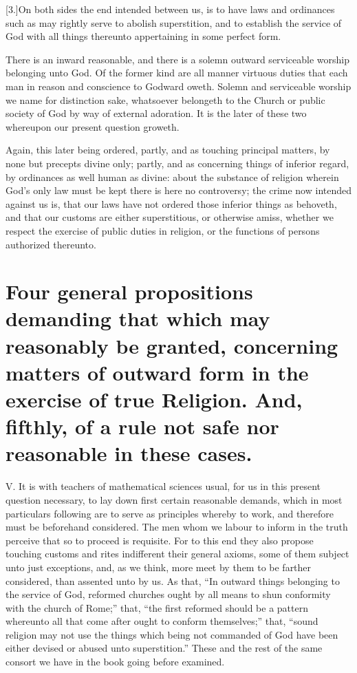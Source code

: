 [3.]On both sides the end intended between us, is to have laws and ordinances such as may rightly serve to abolish superstition, and to establish the service of God with all things thereunto appertaining in some perfect form.

There is an inward reasonable, and there is a solemn outward serviceable worship belonging unto God. Of the former kind are all manner virtuous duties that each man in reason and conscience to Godward oweth. Solemn and serviceable worship we name for distinction sake, whatsoever belongeth to the Church or public society of God by way of external adoration. It is the later of these two whereupon our present question groweth.

Again, this later being ordered, partly, and as touching principal matters, by none but precepts divine only; partly, and as concerning things of inferior regard, by ordinances as well human as divine: about the substance of religion wherein God’s only law must be kept there is here no controversy; the crime now intended against us is, that our laws have not ordered those inferior things as behoveth, and that our customs are either superstitious, or otherwise amiss, whether we respect the exercise of public duties in religion, or the functions of persons authorized thereunto.


\section*{Four general propositions demanding that which may reasonably be granted, concerning matters of outward form in the exercise of true Religion. And, fifthly, of a rule not safe nor reasonable in these cases.}
V. It is with teachers of mathematical sciences usual, for us in this present question necessary, to lay down first certain reasonable demands, which in most particulars following are to serve as principles whereby to work, and therefore must be beforehand considered. The men whom we labour to  inform in the truth perceive that so to proceed is requisite. For to this end they also propose touching customs and rites indifferent their general axioms, some of them subject unto just exceptions, and, as we think, more meet by them to be farther considered, than assented unto by us. As that, “In outward things belonging to the service of God, reformed churches ought by all means to shun conformity with the church of Rome;” that, “the first reformed should be a pattern whereunto all that come after ought to conform themselves;” that, “sound religion may not use the things which being not commanded of God have been either devised or abused unto superstition.” These and the rest of the same consort we have in the book going before examined.

